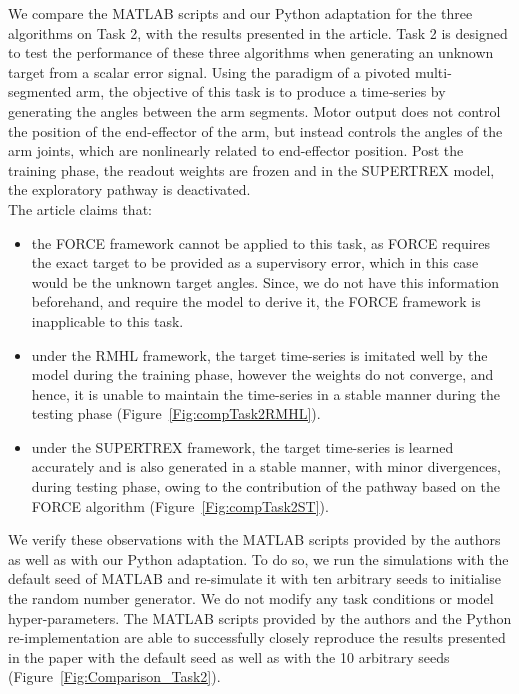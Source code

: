 We compare the MATLAB scripts and our Python adaptation for the three algorithms on Task 2, with the results presented in the article. Task 2 is designed to test the performance of these three algorithms when generating an unknown target from a scalar error signal. Using the paradigm of a pivoted multi-segmented arm, the objective of this task is to produce a time‐series by generating the angles between the arm segments. Motor output does not control the position of the end-effector of the arm, but instead controls the angles of the arm joints, which are nonlinearly related to end-effector position. Post the training phase, the readout weights are frozen and in the SUPERTREX model, the exploratory pathway is deactivated. \\

The article claims that:
\begin{itemize}
\item the FORCE framework cannot be applied to this task, as FORCE requires the exact target to be provided as a supervisory error, which in this case would be the unknown target angles. Since, we do not have this information beforehand, and require the model to derive it, the FORCE framework is inapplicable to this task.  
\item under the RMHL framework, the target time-series is imitated well by the model during the training phase, however the weights do not converge, and hence, it is unable to maintain the time-series in a stable manner during the testing phase (Figure~\ref{Fig:compTask2RMHL}).
\item under the SUPERTREX framework, the target time-series is learned accurately and is also generated in a stable manner, with minor divergences, during testing phase, owing to the contribution of the pathway based on the FORCE algorithm (Figure~\ref{Fig:compTask2ST}).
\end{itemize}

We verify these observations with the MATLAB scripts provided by the authors as well as with our Python adaptation. To do so, we run the simulations with the default seed of MATLAB and re-simulate it with ten arbitrary seeds to initialise the random number generator. We do not modify any task conditions or model hyper-parameters.  The MATLAB scripts provided by the authors and the Python re-implementation are able to successfully closely reproduce the results presented in the paper with the default seed as well as with the 10 arbitrary seeds (Figure~\ref{Fig:Comparison_Task2}).





